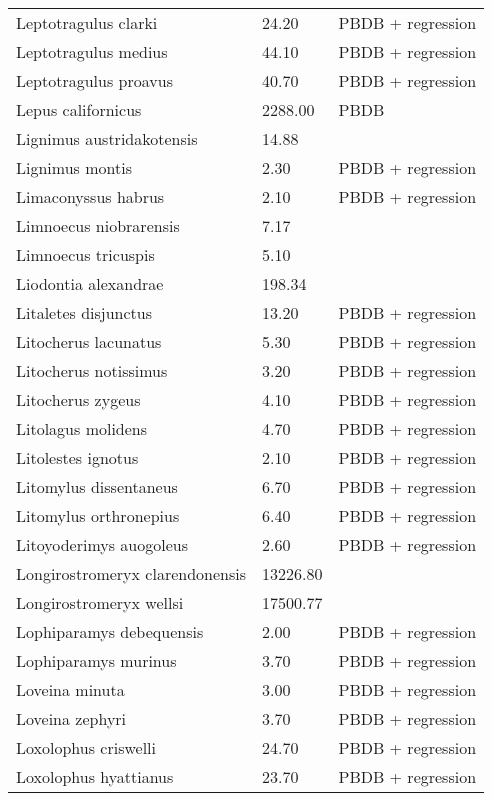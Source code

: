 \documentclass{article}
\begin{document}
\begin{center}
\begin{longtable}{p{} p{} p{}}
    Leptotragulus clarki & 24.20 & PBDB + regression \\ 
    Leptotragulus medius & 44.10 & PBDB + regression \\ 
    Leptotragulus proavus & 40.70 & PBDB + regression \\ 
    Lepus californicus & 2288.00 & PBDB \\ 
    Lignimus austridakotensis & 14.88 & \cite{Tomiya2013} \\ 
    Lignimus montis & 2.30 & PBDB + regression \\ 
    Limaconyssus habrus & 2.10 & PBDB + regression \\ 
    Limnoecus niobrarensis & 7.17 & \cite{Tomiya2013} \\ 
    Limnoecus tricuspis & 5.10 & \cite{Tomiya2013} \\ 
    Liodontia alexandrae & 198.34 & \cite{Tomiya2013} \\ 
    Litaletes disjunctus & 13.20 & PBDB + regression \\ 
    Litocherus lacunatus & 5.30 & PBDB + regression \\ 
    Litocherus notissimus & 3.20 & PBDB + regression \\ 
    Litocherus zygeus & 4.10 & PBDB + regression \\ 
    Litolagus molidens & 4.70 & PBDB + regression \\ 
    Litolestes ignotus & 2.10 & PBDB + regression \\ 
    Litomylus dissentaneus & 6.70 & PBDB + regression \\ 
    Litomylus orthronepius & 6.40 & PBDB + regression \\ 
    Litoyoderimys auogoleus & 2.60 & PBDB + regression \\ 
    Longirostromeryx clarendonensis & 13226.80 & \cite{Tomiya2013} \\ 
    Longirostromeryx wellsi & 17500.77 & \cite{Tomiya2013} \\ 
    Lophiparamys debequensis & 2.00 & PBDB + regression \\ 
    Lophiparamys murinus & 3.70 & PBDB + regression \\ 
    Loveina minuta & 3.00 & PBDB + regression \\ 
    Loveina zephyri & 3.70 & PBDB + regression \\ 
    Loxolophus criswelli & 24.70 & PBDB + regression \\ 
    Loxolophus hyattianus & 23.70 & PBDB + regression \\ 

\end{longtable}
\end{center}
\end{document}
